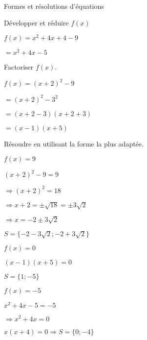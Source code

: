 \begin{EXO}{Formes et résolutions d'équations}{}
\exocorrection

\begin{tcbenumerate}[2]
\tcbitem {} Développer et réduire $f(x)$

\begin{crep}
$f(x) = x^2+4x+4-9 $

$= x^2+4x-5$
\end{crep}

\tcbitem {} Factoriser $f(x)$.

\begin{crep}
$f(x) = (x+2)^2-9 $

$= (x+2)^2-3^2 $

$= (x+2-3)(x+2+3) $

$= (x-1)(x+5)$
\end{crep}
\end{tcbenumerate}
\begin{tcbenumerate}[1][3]
\tcbitem[colframe=black,boxrule=0.4pt] Résoudre en utilisant la forme la plus adaptée.
\vspace{-2mm}
\begin{tcbenumerate}[3][1][alph]
\tcbitem {} $f(x)=9$

\begin{crep}
$(x+2)^2-9 = 9 $

$\Rightarrow (x+2)^2 = 18$

$\Rightarrow x+2 = \pm \sqrt{18} = \pm 3\sqrt{2}$

$\Rightarrow x = -2 \pm 3\sqrt{2}$

$S = \{-2 - 3\sqrt{2} ; -2 + 3\sqrt{2}\}$
\end{crep}

\tcbitem {} $f(x)=0$

\begin{crep}
$(x-1)(x+5) = 0$

$S = \{1 ; -5\}$
\end{crep}

\tcbitem {} $f(x)=-5$

\begin{crep}
$x^2+4x-5 = -5$

$\Rightarrow x^2+4x = 0$

$x(x+4) = 0 \Rightarrow S = \{0 ; -4\}$
\end{crep}
\end{tcbenumerate}
\end{tcbenumerate}
\end{EXO}